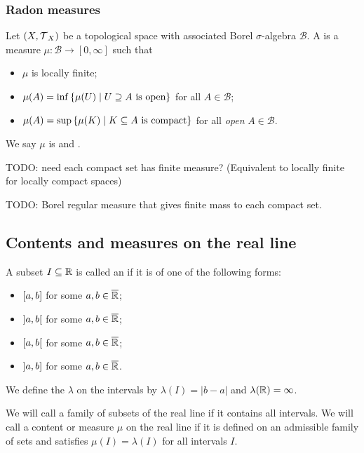 \subsubsection{Radon measures}
\begin{definition}
Let $\sSet{X, \topology_X}$ be a topological space with associated Borel $\sigma$-algebra $\mathcal{B}$. A  is a measure $\mu: \mathcal{B}\to [0,\infty]$ such that
\begin{itemize}
\item $\mu$ is locally finite;
\item $\mu(A) = \inf\setbuilder{\mu(U)}{\text{$U\supseteq A$ is open}}$ for all $A\in \mathcal{B}$;
\item $\mu(A) = \sup\setbuilder{\mu(K)}{\text{$K\subseteq A$ is compact}}$ for all \emph{open} $A\in \mathcal{B}$.
\end{itemize}
We say $\mu$ is  and .
\end{definition}

TODO: need each compact set has finite measure? (Equivalent to locally finite for locally compact spaces)

TODO: Borel regular measure that gives finite mass to each compact set.


\subsection{Contents and measures on the real line}
\begin{definition}
A subset $I\subseteq \mathbb{R}$ is called an  if it is of one of the following forms:
\begin{itemize}
\item $\interval[c]{a,b}$ for some $a,b\in \overline{\mathbb{R}}$;
\item $\interval[o]{a,b}$ for some $a,b\in \overline{\mathbb{R}}$;
\item $\interval[co]{a,b}$ for some $a,b\in \overline{\mathbb{R}}$;
\item $\interval[oc]{a,b}$ for some $a,b\in \overline{\mathbb{R}}$.
\end{itemize}
We define the  $\lambda$ on the intervals by $\lambda(I) = |b-a|$ and $\lambda(\mathbb{R}) = \infty$.

We will call a family of subsets of the real line  if it contains all intervals. We will call a content or measure $\mu$ on the real line  if it is defined on an admissible family of sets and satisfies $\mu(I) = \lambda(I)$ for all intervals $I$.
\end{definition}

